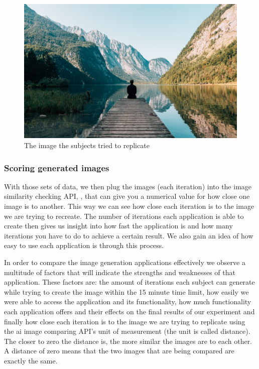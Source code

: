 \documentclass[]{report}
\begin{document}
	\begin{figure}[!h]
		\centering
		\includegraphics[width=1\linewidth]{OG}
		\caption{The image the subjects tried to replicate}
		\label{fig:og}
	\end{figure}
	
	\subsubsection{Scoring generated images}
	With those sets of data, we then plug the images (each iteration) into the image similarity checking API, \cite{imageSimilarity}, that can give you a numerical value for how close one image is to another. This way we can see how close each iteration is to the image we are trying to recreate. The number of iterations each application is able to create then gives us insight into how fast the application is and how many iterations you have to do to achieve a certain result. We also gain an idea of how easy to use each application is through this process.
	
	In order to compare the image generation applications effectively we observe a multitude of factors that will indicate the strengths and weaknesses of that application. These factors are: the amount of iterations each subject can generate while trying to create the image within the 15 minute time limit, how easily we were able to access the application and its functionality, how much functionality each application offers and their effects on the final results of our experiment and finally how close each iteration is to the image we are trying to replicate using the ai image comparing API's unit of measurement (the unit is called distance). The closer to zero the distance is, the more similar the images are to each other. A distance of zero means that the two images that are being compared are exactly the same.
	
\end{document}
